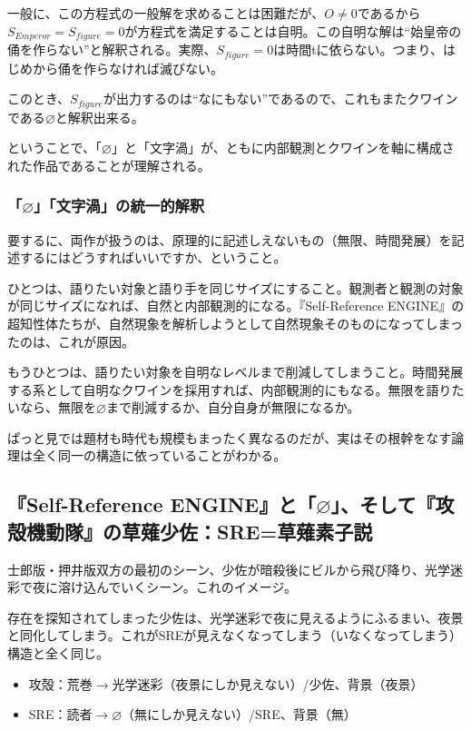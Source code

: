 \documentclass[10pt, a5paper, twoside]{jsarticle}
\begin{document}
				一般に、この方程式の一般解を求めることは困難だが、$ O \neq 0 $であるから$ S_{Emperor} = S_{figure} = 0 $が方程式を満足することは自明。この自明な解は“始皇帝の俑を作らない”と解釈される。実際、$ S_{figure} = 0 $は時間tに依らない。つまり、はじめから俑を作らなければ滅びない。

				このとき、$ S_{figure} $が出力するのは“なにもない”であるので、これもまたクワインである$ \varnothing $と解釈出来る。

				ということで、「$ \varnothing $」と「文字渦」が、ともに内部観測とクワインを軸に構成された作品であることが理解される。

			\subsubsection{「$ \varnothing $」「文字渦」の統一的解釈}

				要するに、両作が扱うのは、原理的に記述しえないもの（無限、時間発展）を記述するにはどうすればいいですか、ということ。

				ひとつは、語りたい対象と語り手を同じサイズにすること。観測者と観測の対象が同じサイズになれば、自然と内部観測的になる。『Self-Reference ENGINE』の超知性体たちが、自然現象を解析しようとして自然現象そのものになってしまったのは、これが原因。

				もうひとつは、語りたい対象を自明なレベルまで削減してしまうこと。時間発展する系として自明なクワインを採用すれば、内部観測的にもなる。無限を語りたいなら、無限を$ \varnothing $まで削減するか、自分自身が無限になるか。

				ぱっと見では題材も時代も規模もまったく異なるのだが、実はその根幹をなす論理は全く同一の構造に依っていることがわかる。

		\subsection{『Self-Reference ENGINE』と「$ \varnothing $」、そして『攻殻機動隊』の草薙少佐：SRE=草薙素子説}

			士郎版・押井版双方の最初のシーン、少佐が暗殺後にビルから飛び降り、光学迷彩で夜に溶け込んでいくシーン。これのイメージ。
			
			存在を探知されてしまった少佐は、光学迷彩で夜に見えるようにふるまい、夜景と同化してしまう。これがSREが見えなくなってしまう（いなくなってしまう）構造と全く同じ。

			\begin{itemize}

				\item 攻殻：荒巻$ \rightarrow $光学迷彩（夜景にしか見えない）/少佐、背景（夜景）

				\item SRE：読者$ \rightarrow \varnothing$（無にしか見えない）/SRE、背景（無）

			\end{itemize}
\end{document}
